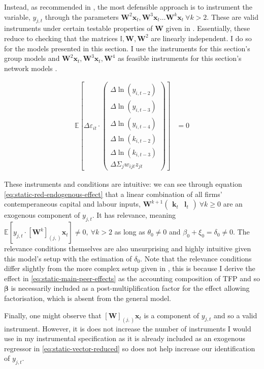 Instead, as recommended in \cite{Bramoulle2009},
the most defensible approach is to instrument the  variable, $y_{j,t}$
through the  parameters
$\mathbf W^2\mathbf x_t, \mathbf W^3\mathbf x_t \dots \mathbf W^k \mathbf x_t\ \forall k>2$.
These are valid instruments under certain testable properties of $\mathbf W$ given in .
Essentially, these reduce to checking that the matrices $\mathbb I, \mathbf W, \mathbf W^2$ are linearly independent.
I do so for the models presented in this section.
I use the instruments
 for this section's group models 
and $\mathbf W^2\mathbf x_t, \mathbf W^3\mathbf x_t, \mathbf W^4$ as feasible instruments for this section's network models
.

\begin{align}
    \label{eq:static-moment-conditions}
    \mathbb E \left[
        \Delta\varepsilon_{it}
        \cdot
        \begin{pmatrix}
            \Delta \ln(y_{i,t-2})     \\
            \Delta \ln(y_{i,t-3})     \\
            \Delta \ln(y_{i,t-4})     \\
            \Delta \ln(k_{i,t-2})     \\
            \Delta \ln(k_{i,t-3})     \\
            \Delta \Sigma_jw_{ijt}z_{jt}
        \end{pmatrix}
    \right]
    &= 0
\end{align}

These instruments and conditions are intuitive:
we can see through equation \eqref{eq:static-red-endogenous-effect} that
a linear combination of all firms' contemperaneous capital and labour inputs,
$\mathbf W^{k+1}\begin{pmatrix}\mathbf k_t & \mathbf l_t\end{pmatrix}\ \forall k\geq0$ 
are an exogenous component of $y_{j,t}$.
It has relevance, meaning $\mathbb E[y_{j,t}\cdot [\mathbf W^k]_{(j,)}\mathbf x_t]\neq 0,\ \forall k>2$
as long as $\theta_0\neq 0$ and $\beta_0 + \xi_0 = \delta_0 \neq 0$.
The relevance conditions themselves are also unsurprising and highly intuitive
given this model's setup with the estimation of $\delta_0$.
Note that the relevance conditions differ slightly from the more complex setup given in \cite{Bramoulle2009},
this is because I derive the  effect in \eqref{eq:static-main-peer-effects}
as the accounting composition of TFP and so $\mathbf \beta$ is necessarily included as a post-multiplification
factor for the  effect allowing factorisation, which is absent from the general model.
\par
Finally, one might observe that $[\mathbf W]_{(j,)}\mathbf x_t$
is a component of $y_{j,t}$ and so a valid instrument.
However, it is does not increase the number of instruments I would use in my instrumental specification
as it is already included as an exogenous regressor in \ref{eq:static-vector-reduced}
so does not help increase our identification of $y_{j,t}$.

